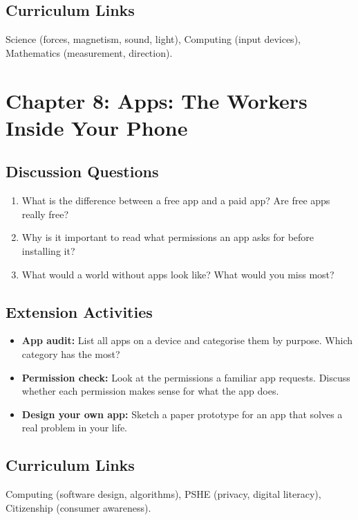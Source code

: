 \subsection*{Curriculum Links}
Science (forces, magnetism, sound, light), Computing (input devices), Mathematics (measurement, direction).

\sectionrule

\section*{Chapter 8: Apps: The Workers Inside Your Phone}

\subsection*{Discussion Questions}
\begin{enumerate}
  \item What is the difference between a free app and a paid app? Are free apps really free?
  \item Why is it important to read what permissions an app asks for before installing it?
  \item What would a world without apps look like? What would you miss most?
\end{enumerate}

\subsection*{Extension Activities}
\begin{itemize}
  \item \textbf{App audit:} List all apps on a device and categorise them by purpose. Which category has the most?
  \item \textbf{Permission check:} Look at the permissions a familiar app requests. Discuss whether each permission makes sense for what the app does.
  \item \textbf{Design your own app:} Sketch a paper prototype for an app that solves a real problem in your life.
\end{itemize}

\subsection*{Curriculum Links}
Computing (software design, algorithms), PSHE (privacy, digital literacy), Citizenship (consumer awareness).

